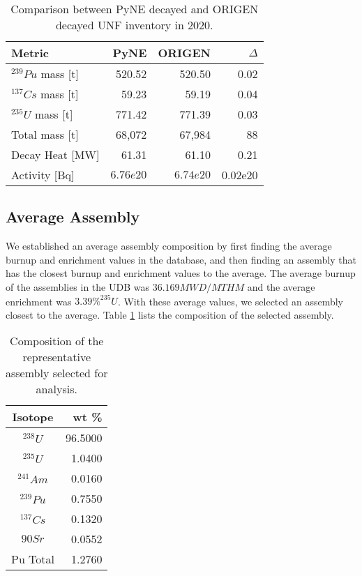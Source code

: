 \documentclass{anstrans}
\begin{document}
\begin{table}[h]
    \centering
    \begin{tabular}{lrrr}
        \hline
        Metric & PyNE & ORIGEN & $\Delta$ \\
        \hline
        $^{239}Pu$ mass [t] & 520.52 & 520.50 & 0.02\\
        $^{137}Cs$ mass [t] & 59.23 & 59.19 & 0.04\\
        $^{235}U$ mass [t] & 771.42 & 771.39 & 0.03\\
        Total mass [t] & 68,072 & 67,984 & 88\\
        Decay Heat [MW] & 61.31 & 61.10 & 0.21 \\
        Activity [Bq] & $6.76e20$ & $6.74e20$ & 0.02e20 \\
        \hline
    \end{tabular}
    \caption{Comparison between \gls{PyNE} decayed and ORIGEN decayed \gls{UNF} inventory in 2020.}
\end{table}

\subsection{Average Assembly}
We established an average assembly composition by first finding the
average burnup and enrichment values in the database,
and then finding an assembly that has the closest
burnup and enrichment values to the average.
The average burnup of the assemblies in the \gls{UDB} was $36.169 MWD/MTHM$
and the average enrichment was $3.39 \% ^{235}U$. With these
average values, we selected an assembly closest to the
average. Table \ref{tab:avg} lists the composition of the selected assembly.

\begin{table}[h]
    \centering
    \begin{tabular}{cr}
        \hline
        Isotope & wt \% \\
        \hline
        $^{238}U$ & 96.5000 \\
        $^{235}U$ & 1.0400 \\
        $^{241}Am$ & 0.0160 \\
        $^{239}Pu$ & 0.7550   \\
        $^{137}Cs$ & 0.1320   \\
        ${90}Sr$ & 0.0552  \\
        Pu Total & 1.2760   \\
        \hline
    \end{tabular}
    \caption{Composition of the representative
             assembly selected for analysis.}
    \label{tab:avg}
\end{table}
\end{document}
